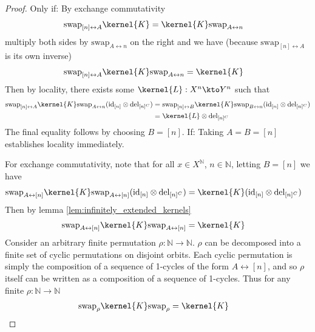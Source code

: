 \begin{proof}
Only if:
By exchange commutativity
\begin{align}
	\text{swap}_{[n]\leftrightarrow A} \kernel{K} &= \kernel{K} \text{swap}_{A\leftrightarrow n}
\end{align}
multiply both sides by $\text{swap}_{A\leftrightarrow n}$ on the right and we have (because $\text{swap}_{[n]\leftrightarrow A}$ is its own inverse)
\begin{align}
		\text{swap}_{[n]\leftrightarrow A} \kernel{K}\text{swap}_{A\leftrightarrow n} &= \kernel{K}
\end{align}
Then by locality, there exists some $\kernel{L}:X^n\kto Y^n$ such that
\begin{align}
	\text{swap}_{[n]\leftrightarrow A} \kernel{K} \text{swap}_{A\leftrightarrow n} (\text{id}_{[n]}\otimes \text{del}_{[n]^C}) &= \text{swap}_{[n]\leftrightarrow B} \kernel{K} \text{swap}_{B\leftrightarrow n} (\text{id}_{[n]}\otimes \text{del}_{[n]^C})\\
	&= \kernel{L}\otimes \mathrm{del}_{[n]^C}
\end{align}
The final equality follows by choosing $B=[n]$.
If:
Taking $A=B=[n]$ establishes locality immediately.

For exchange commutativity, note that for all $x\in X^{\mathbb{N}}$, $n\in\mathbb{N}$, letting $B=[n]$ we have
\begin{align}
	\text{swap}_{A\leftrightarrow [n]} \kernel{K} \text{swap}_{A\leftrightarrow [n]} (\text{id}_{[n]}\otimes \text{del}_{[n]^C}) &= \kernel{K}  (\text{id}_{[n]}\otimes \text{del}_{[n]^C})
\end{align}
Then by lemma \ref{lem:infinitely_extended_kernels}
\begin{align}
	\text{swap}_{A\leftrightarrow [n]} \kernel{K} \text{swap}_{A\leftrightarrow [n]} &= \kernel{K}
\end{align}
Consider an arbitrary finite permutation $\rho:\mathbb{N}\to \mathbb{N}$. $\rho$ can be decomposed into a finite set of cyclic permutations on disjoint orbits. Each cyclic permutation is simply the composition of a sequence of 1-cycles of the form $A\leftrightarrow [n]$, and so $\rho$ itself can be written as a composition of a sequence of 1-cycles. Thus for any finite $\rho:\mathbb{N}\to\mathbb{N}$
\begin{align}
	\text{swap}_{\rho} \kernel{K} \text{swap}_{\rho} &= \kernel{K}
\end{align}
\end{proof}

